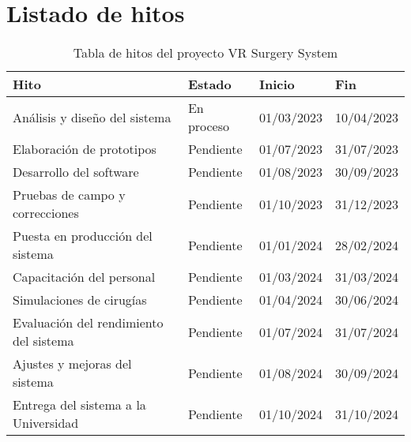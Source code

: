   \section{Listado de hitos}

  \begin{table}[h]
    \centering
    \caption{Tabla de hitos del proyecto VR Surgery System}
    \begin{tabular}{|p{7.5cm}|p{2.3cm}|p{2.2cm}|p{2.2cm}|}
      \hline
      \rowcolor[HTML]{E6E6FA}
      \textbf{\color{darkblue}Hito} & \textbf{\color{darkblue}Estado} & \textbf{\color{darkblue}Inicio} & \textbf{\color{darkblue}Fin} \\ \hline
      \cellcolor[HTML]{F0FFFC} Análisis y diseño del sistema & \cellcolor{yellow!25} En proceso & \cellcolor[HTML]{F0FFFC} 01/03/2023 & \cellcolor[HTML]{F0FFFC} 10/04/2023 \\ \hline
      \cellcolor[HTML]{F6FFFD} Elaboración de prototipos & \cellcolor{red!25} Pendiente & \cellcolor[HTML]{F6FFFD} 01/07/2023 & \cellcolor[HTML]{F6FFFD} 31/07/2023 \\ \hline
      \cellcolor[HTML]{F0FFFC} Desarrollo del software & \cellcolor{red!25} Pendiente & \cellcolor[HTML]{F0FFFC} 01/08/2023 & \cellcolor[HTML]{F0FFFC} 30/09/2023 \\ \hline
      \cellcolor[HTML]{F6FFFD} Pruebas de campo y correcciones & \cellcolor{red!25} Pendiente & \cellcolor[HTML]{F6FFFD} 01/10/2023 & \cellcolor[HTML]{F6FFFD} 31/12/2023 \\ \hline
      \cellcolor[HTML]{F0FFFC} Puesta en producción del sistema & \cellcolor{red!25} Pendiente & \cellcolor[HTML]{F0FFFC} 01/01/2024 & \cellcolor[HTML]{F0FFFC} 28/02/2024 \\ \hline
      \cellcolor[HTML]{F6FFFD} Capacitación del personal & \cellcolor{red!25} Pendiente & \cellcolor[HTML]{F6FFFD} 01/03/2024 & \cellcolor[HTML]{F6FFFD} 31/03/2024 \\ \hline
      \cellcolor[HTML]{F0FFFC} Simulaciones de cirugías & \cellcolor{red!25} Pendiente & \cellcolor[HTML]{F0FFFC} 01/04/2024 & \cellcolor[HTML]{F0FFFC} 30/06/2024 \\ \hline
      \cellcolor[HTML]{F6FFFD} Evaluación del rendimiento del sistema & \cellcolor{red!25} Pendiente & \cellcolor[HTML]{F6FFFD} 01/07/2024 & \cellcolor[HTML]{F6FFFD} 31/07/2024 \\ \hline
      \cellcolor[HTML]{F0FFFC} Ajustes y mejoras del sistema & \cellcolor{red!25} Pendiente & \cellcolor[HTML]{F0FFFC} 01/08/2024 & \cellcolor[HTML]{F0FFFC} 30/09/2024 \\ \hline
      \cellcolor[HTML]{F6FFFD} Entrega del sistema a la Universidad & \cellcolor{red!25} Pendiente & \cellcolor[HTML]{F6FFFD} 01/10/2024 & \cellcolor[HTML]{F6FFFD} 31/10/2024 \\ \hline
    \end{tabular}


\end{table}
